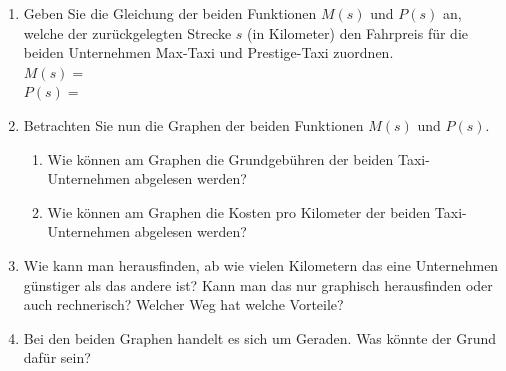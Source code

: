 \begin{enumerate}
    \item Geben Sie die Gleichung der beiden Funktionen $M(s)$ und $P(s)$ an, welche der zurückgelegten Strecke $s$ (in Kilometer) den Fahrpreis für die beiden Unternehmen Max-Taxi und Prestige-Taxi zuordnen.\\[0.4cm]
          $M(s) =$\\[0.8cm]
          $P(s) =$\\[0.4cm]
    \item Betrachten Sie nun die Graphen der beiden Funktionen $M(s)$ und $P(s)$.
          \begin{center}
          \end{center}
          \begin{enumerate}
              \item Wie können am Graphen die Grundgebühren der beiden Taxi-Unternehmen abgelesen werden?
              \item Wie können am Graphen die Kosten pro Kilometer der beiden Taxi-Unternehmen abgelesen werden?
          \end{enumerate}
    \item Wie kann man herausfinden, ab wie vielen Kilometern das eine Unternehmen günstiger als das andere ist? Kann man das nur graphisch herausfinden oder auch rechnerisch? Welcher Weg hat welche Vorteile?
    \item Bei den beiden Graphen handelt es sich um Geraden. Was könnte der Grund dafür sein?
\end{enumerate}
\newpage
